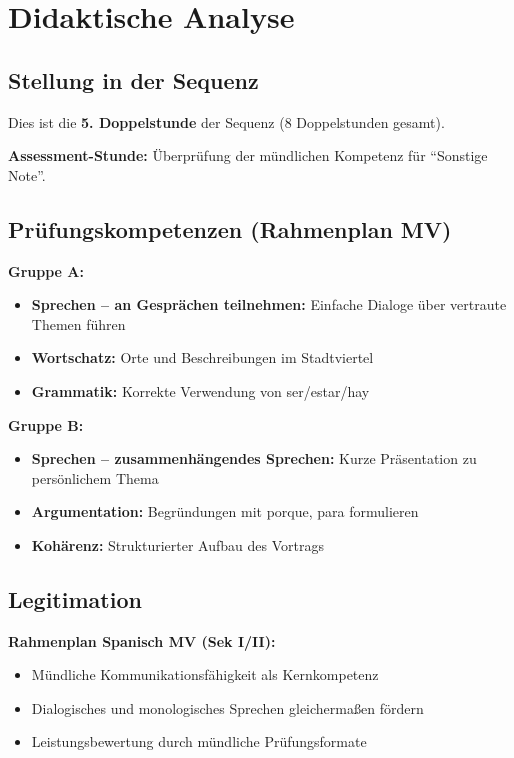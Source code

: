 \documentclass[11pt,a4paper]{article}
\begin{document}
\section{Didaktische Analyse}

\subsection{Stellung in der Sequenz}
Dies ist die \textbf{5. Doppelstunde} der Sequenz (8 Doppelstunden gesamt).

\textbf{Assessment-Stunde:} Überprüfung der mündlichen Kompetenz für ``Sonstige Note''.

\subsection{Prüfungskompetenzen (Rahmenplan MV)}

\textbf{Gruppe A:}
\begin{itemize}
    \item \textbf{Sprechen -- an Gesprächen teilnehmen:} Einfache Dialoge über vertraute Themen führen
    \item \textbf{Wortschatz:} Orte und Beschreibungen im Stadtviertel
    \item \textbf{Grammatik:} Korrekte Verwendung von ser/estar/hay
\end{itemize}

\textbf{Gruppe B:}
\begin{itemize}
    \item \textbf{Sprechen -- zusammenhängendes Sprechen:} Kurze Präsentation zu persönlichem Thema
    \item \textbf{Argumentation:} Begründungen mit porque, para formulieren
    \item \textbf{Kohärenz:} Strukturierter Aufbau des Vortrags
\end{itemize}

\subsection{Legitimation}
\textbf{Rahmenplan Spanisch MV (Sek I/II):}
\begin{itemize}
    \item Mündliche Kommunikationsfähigkeit als Kernkompetenz
    \item Dialogisches und monologisches Sprechen gleichermaßen fördern
    \item Leistungsbewertung durch mündliche Prüfungsformate
\end{itemize}
\end{document}
